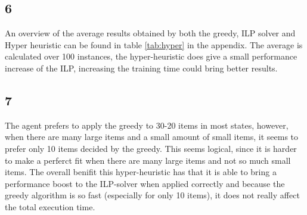 \subsection*{6}
An overview of the average results obtained by both the greedy, ILP solver and Hyper heuristic can be found in table \ref{tab:hyper} in the appendix. The average is calculated over 100 instances, the hyper-heuristic does give a small performance increase of the ILP, increasing the training time could bring better results.
\subsection*{7}
The agent prefers to apply the greedy to 30-20 items in most states, however, when there are many large items and a small amount of small items, it seems to prefer only 10 items decided by the greedy. This seems logical, since it is harder to make a perferct fit when there are many large items and not so much small items. The overall benifit this hyper-heuristic has that it is able to bring a performance boost to the ILP-solver when applied correctly and because the greedy algorithm is so fast (especially for only 10 items), it does not really affect the total execution time.

